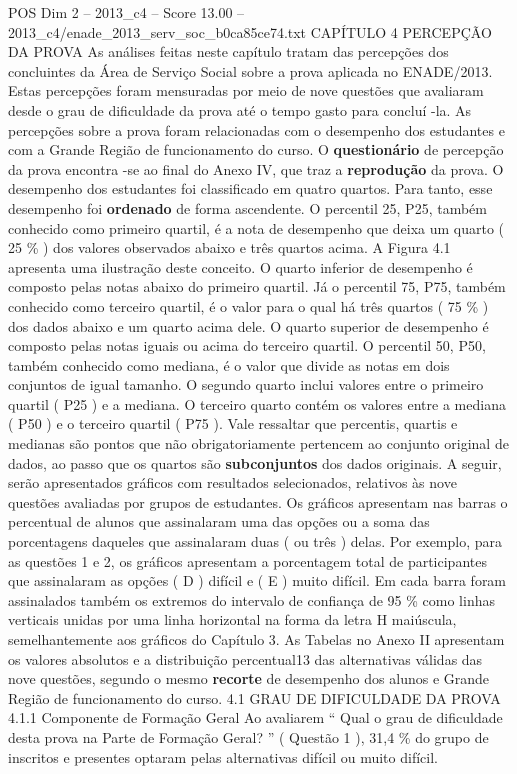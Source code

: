 \begin{textsample}{POS Dim 2 – 2013\_c4 – Score 13.00 – 2013\_c4/enade\_2013\_serv\_soc\_b0ca85ce74.txt}  \label{ex:f2_pos_063}
CAPÍTULO 4 PERCEPÇÃO DA PROVA As análises feitas neste capítulo tratam das percepções dos concluintes da Área de Serviço Social sobre a prova aplicada no ENADE/2013.
Estas percepções foram mensuradas por meio de nove questões que avaliaram desde o grau de dificuldade da prova até o tempo gasto para concluí -la.
As percepções sobre a prova foram relacionadas com o desempenho dos estudantes e com a Grande Região de funcionamento do curso.
O \textbf{questionário} de percepção da prova encontra -se ao final do Anexo IV, que traz a \textbf{reprodução} da prova.
O desempenho dos estudantes foi classificado em quatro quartos.
Para tanto, esse desempenho foi \textbf{ordenado} de forma ascendente.
O percentil 25, P25, também conhecido como primeiro quartil, é a nota de desempenho que deixa um quarto ( 25 \% ) dos valores observados abaixo e três quartos acima.
A Figura 4.1 apresenta uma ilustração deste conceito.
O quarto inferior de desempenho é composto pelas notas abaixo do primeiro quartil.
Já o percentil 75, P75, também conhecido como terceiro quartil, é o valor para o qual há três quartos ( 75 \% ) dos dados abaixo e um quarto acima dele.
O quarto superior de desempenho é composto pelas notas iguais ou acima do terceiro quartil.
O percentil 50, P50, também conhecido como mediana, é o valor que divide as notas em dois conjuntos de igual tamanho.
O segundo quarto inclui valores entre o primeiro quartil ( P25 ) e a mediana.
O terceiro quarto contém os valores entre a mediana ( P50 ) e o terceiro quartil ( P75 ).
Vale ressaltar que percentis, quartis e medianas são pontos que não obrigatoriamente pertencem ao conjunto original de dados, ao passo que os quartos são \textbf{subconjuntos} dos dados originais.
A seguir, serão apresentados gráficos com resultados selecionados, relativos às nove questões avaliadas por grupos de estudantes.
Os gráficos apresentam nas barras o percentual de alunos que assinalaram uma das opções ou a soma das porcentagens daqueles que assinalaram duas ( ou três ) delas.
Por exemplo, para as questões 1 e 2, os gráficos apresentam a porcentagem total de participantes que assinalaram as opções ( D ) difícil e ( E ) muito difícil.
Em cada barra foram assinalados também os extremos do intervalo de confiança de 95 \% como linhas verticais unidas por uma linha horizontal na forma da letra H maiúscula, semelhantemente aos gráficos do Capítulo 3.
As Tabelas no Anexo II apresentam os valores absolutos e a distribuição percentual13 das alternativas válidas das nove questões, segundo o mesmo \textbf{recorte} de desempenho dos alunos e Grande Região de funcionamento do curso. 4.1 GRAU DE DIFICULDADE DA PROVA 4.1.1 Componente de Formação Geral Ao avaliarem “ Qual o grau de dificuldade desta prova na Parte de Formação Geral? ” ( Questão 1 ), 31,4 \% do grupo de inscritos e presentes optaram pelas alternativas difícil ou muito difícil.

\end{textsample}
